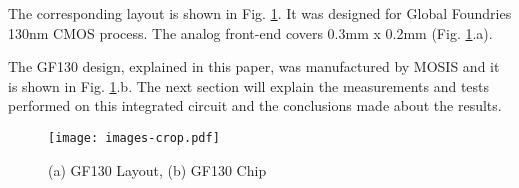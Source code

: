 The corresponding layout is shown in Fig. \ref{fig:layout}. It was designed for Global Foundries 130nm CMOS process. The analog front-end covers 0.3mm x 0.2mm (Fig. \ref{fig:layout}.a).

The GF130 design, explained in this paper, was manufactured by MOSIS \cite{mosis} and it is shown in Fig. \ref{fig:layout}.b. The next section will explain the measurements and tests performed on this integrated circuit and the conclusions made about the results.

\begin{figure}[h]
  \centering
  \texttt{[image: images-crop.pdf]}
  \caption{(a) GF130 Layout, (b) GF130 Chip}
  \label{fig:layout}
\end{figure}